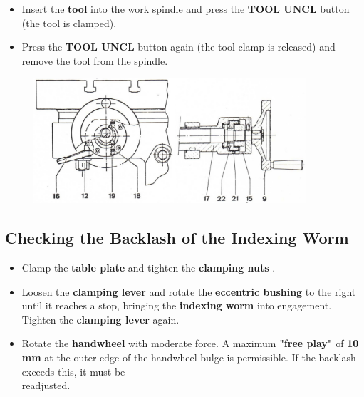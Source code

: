 \begin{itemize}
    \item Insert the \textbf{tool} into the work spindle and press the \textbf{TOOL UNCL} button (the tool is clamped).\footnotemark[1]
    \item Press the \textbf{TOOL UNCL} button again (the tool clamp is released) and remove the tool from the spindle.
\end{itemize}



\setcounter{section}{40}

\begin{figure}[H]
    \centering
    \includegraphics[width=0.9\textwidth]{images/chapter7/rotary_table_adjustment.jpg}
    \label{fig:rotary_table_adjustment}
\end{figure}

\subsection*{Checking the Backlash of the Indexing Worm}

\begin{itemize}
    \item Clamp the \textbf{table plate} and tighten the \textbf{clamping nuts }.
    \item Loosen the \textbf{clamping lever } and rotate the \textbf{eccentric bushing } to the right until it reaches a stop, bringing the \textbf{indexing worm} into engagement. Tighten the \textbf{clamping lever } again.
    \item Rotate the \textbf{handwheel } with moderate force.  
          A maximum \textbf{"free play"} of \textbf{10 mm} at the outer edge of the handwheel bulge is permissible.  
          If the backlash exceeds this, it must be \\readjusted.
\end{itemize}

